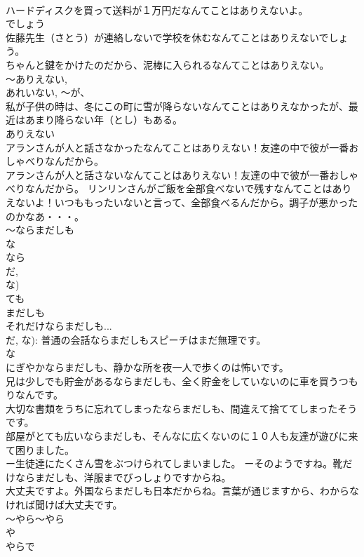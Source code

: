 \documentclass[8pt]{extreport}
\begin{document}
\begin{CJK}{UTF8}{min}
\\	ハードディスクを買って送料が１万円だなんてことはありえないよ。 
\\	でしょう 
\\	佐藤先生（さとう）が連絡しないで学校を休むなんてことはありえないでしょう。 
\\	ちゃんと鍵をかけたのだから、泥棒に入られるなんてことはありえない。 
\\	～ありえない, 
\\	あれいない, ～が、 
\\	私が子供の時は、冬にこの町に雪が降らないなんてことはありえなかったが、最近はあまり降らない年（とし）もある。 
\\	ありえない 
\\	アランさんが人と話さなかったなんてことはありえない！友達の中で彼が一番おしゃべりなんだから。 
\\	アランさんが人と話さないなんてことはありえない！友達の中で彼が一番おしゃべりなんだから。 リンリンさんがご飯を全部食べないで残すなんてことはありえないよ！いつももったいないと言って、全部食べるんだから。調子が悪かったのかなあ・・・。
\\	～ならまだしも	
\\	な
\\	なら 
\\	だ, 
\\	な) 
\\	ても 
\\	まだしも 
\\	それだけならまだしも... 
\\	だ, な): 普通の会話ならまだしもスピーチはまだ無理です。 
\\	な
\\	にぎやかならまだしも、静かな所を夜一人で歩くのは怖いです。 
\\	兄は少しでも貯金があるならまだしも、全く貯金をしていないのに車を買うつもりなんです。 
\\	大切な書類をうちに忘れてしまったならまだしも、間違えて捨ててしまったそうです。 
\\	部屋がとても広いならまだしも、そんなに広くないのに１０人も友達が遊びに来て困りました。 
\\	ー生徒達にたくさん雪をぶつけられてしまいました。 ーそのようですね。靴だけならまだしも、洋服までびっしょりですからね。 
\\	大丈夫ですよ。外国ならまだしも日本だからね。言葉が通じますから、わからなければ聞けば大丈夫です。
\\	～やら～やら	
\\	や 
\\	やらで

\end{CJK}
\end{document}
